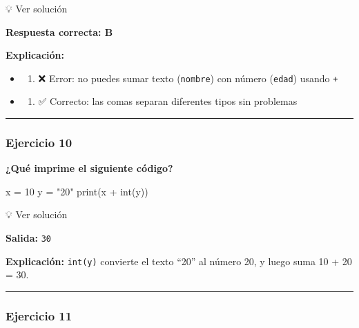 \documentclass[
  doc,
  floatsintext,
  longtable,
  a4paper,
  nolmodern,
  notxfonts,
  notimes,
  12pt,
  colorlinks=true,linkcolor=blue,citecolor=blue,urlcolor=blue]{apa7}
\newenvironment{Shaded}{\begin{snugshade}}{\end{snugshade}}
\newcommand{\BuiltInTok}[1]{\textcolor[rgb]{0.00,0.23,0.31}{#1}}
\newcommand{\DecValTok}[1]{\textcolor[rgb]{0.68,0.00,0.00}{#1}}
\newcommand{\NormalTok}[1]{\textcolor[rgb]{0.00,0.23,0.31}{#1}}
\newcommand{\OperatorTok}[1]{\textcolor[rgb]{0.37,0.37,0.37}{#1}}
\newcommand{\StringTok}[1]{\textcolor[rgb]{0.13,0.47,0.30}{#1}}
\providecommand{\tightlist}{%
  \setlength{\itemsep}{0pt}\setlength{\parskip}{0pt}}
\begin{document}
💡 Ver solución

\textbf{Respuesta correcta: B}

\textbf{Explicación:}

\begin{itemize}
\item
  \begin{enumerate}
  \def\labelenumi{\Alph{enumi})}
  \tightlist
  \item
    ❌ Error: no puedes sumar texto (\texttt{nombre}) con número
    (\texttt{edad}) usando \texttt{+}
  \end{enumerate}
\item
  \begin{enumerate}
  \def\labelenumi{\Alph{enumi})}
  \setcounter{enumi}{1}
  \tightlist
  \item
    ✅ Correcto: las comas separan diferentes tipos sin problemas
  \end{enumerate}
\end{itemize}

\begin{center}\rule{0.5\linewidth}{0.5pt}\end{center}

\subsubsection{Ejercicio 10}\label{ejercicio-10}

\textbf{¿Qué imprime el siguiente código?}

\begin{Shaded}
\begin{Highlighting}[]
\NormalTok{x }\OperatorTok{=} \DecValTok{10}
\NormalTok{y }\OperatorTok{=} \StringTok{"20"}
\BuiltInTok{print}\NormalTok{(x }\OperatorTok{+} \BuiltInTok{int}\NormalTok{(y))}
\end{Highlighting}
\end{Shaded}

💡 Ver solución

\textbf{Salida:} \texttt{30}

\textbf{Explicación:} \texttt{int(y)} convierte el texto ``20'' al
número 20, y luego suma 10 + 20 = 30.

\begin{center}\rule{0.5\linewidth}{0.5pt}\end{center}

\subsubsection{Ejercicio 11}\label{ejercicio-11}
\end{document}
